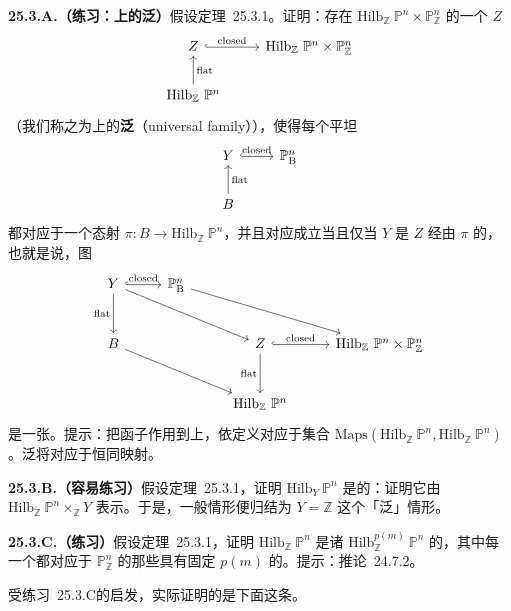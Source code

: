 \textbf{25.3.A.（练习：\trHilbertScheme{}上的泛\trFamily）}\quad 假设\mbox{定理~25.3.1}。证明：存在 $\mathrm{Hilb}_{\mathbb{Z}}\ \mathbb{P}^n\times\mathbb{P}^n_{\mathbb{Z}}$ 的一个\trClosedSubscheme{} $Z$
\[
\begin{tikzcd}
Z \ar[r, hook, "\text{closed}"] & \mathrm{Hilb}_{\mathbb{Z}}\ \mathbb{P}^n\times\mathbb{P}^n_{\mathbb{Z}} \\
\mathrm{Hilb}_{\mathbb{Z}}\ \mathbb{P}^n \ar[u, "\text{flat}"']
\end{tikzcd}
\]
（我们称之为\trHilbertScheme{}上的\textbf{泛\trFamily}（universal family）），使得每个平坦\trFamily
\[
\begin{tikzcd}
Y \ar[r, hook, "\text{closed}"] & \mathbb{P}^n_{\mathrm{B}} \\
B \ar[u, "\text{flat}"']
\end{tikzcd}
\]
都对应于一个态射 $\pi\colon B\to\mathrm{Hilb}_{\mathbb{Z}}\ \mathbb{P}^n$，并且对应成立当且仅当 $Y$ 是 $Z$ 经由 $\pi$ 的\trPullback，也就是说，图
\[
\begin{tikzcd}[row sep=2.6em, column sep=2.6em]
Y \ar[r, hook, "\text{closed}"] \ar[d, "\text{flat}"'] \ar[drr] & \mathbb{P}^n_{\mathrm{B}} \ar[drr] \\
B \ar[drr] & & Z \ar[r, hook, "\text{closed}"] \ar[d, "\text{flat}"'] & \mathrm{Hilb}_{\mathbb{Z}}\ \mathbb{P}^n\times\mathbb{P}^n_{\mathbb{Z}} \\
& & \mathrm{Hilb}_{\mathbb{Z}}\ \mathbb{P}^n &
\end{tikzcd}
\]
是一张\trCartesianDiagram。提示：把\trHilbert{}函子作用到\trHilbertScheme{}上，依定义对应于集合 $\mathrm{Maps}(\mathrm{Hilb}_{\mathbb{Z}}\ \mathbb{P}^n,\mathrm{Hilb}_{\mathbb{Z}}\ \mathbb{P}^n)$。泛\trFamily{}将对应于恒同映射。

\textbf{25.3.B.（容易练习）}\quad 假设\mbox{定理~25.3.1}，证明 $\mathrm{Hilb}_Y\ \mathbb{P}^n$ 是\trRepresentable{}的：证明它由 $\mathrm{Hilb}_{\mathbb{Z}}\ \mathbb{P}^n\times_{\mathbb{Z}}Y$ 表示。于是，一般情形便归结为 $Y=\mathbb{Z}$ 这个「泛」情形。

\textbf{25.3.C.（练习）}\quad 假设\mbox{定理~25.3.1}，证明 $\mathrm{Hilb}_{\mathbb{Z}}\ \mathbb{P}^n$ 是诸\trScheme{} $\mathrm{Hilb}^{p(m)}_{\mathbb{Z}}\ \mathbb{P}^n$ 的\trDisjointUnion，其中每一个都对应于 $\mathbb{P}^n_{\mathbb{Z}}$ 的那些\trFiber{}具有固定\trHilbertPolynomial{} $p(m)$ 的\trFinitelyPresented\trClosedSubscheme。提示：\mbox{推论~24.7.2}。

受\mbox{练习~25.3.C}的启发，\trGrothendieck{}实际证明的是下面这条。

